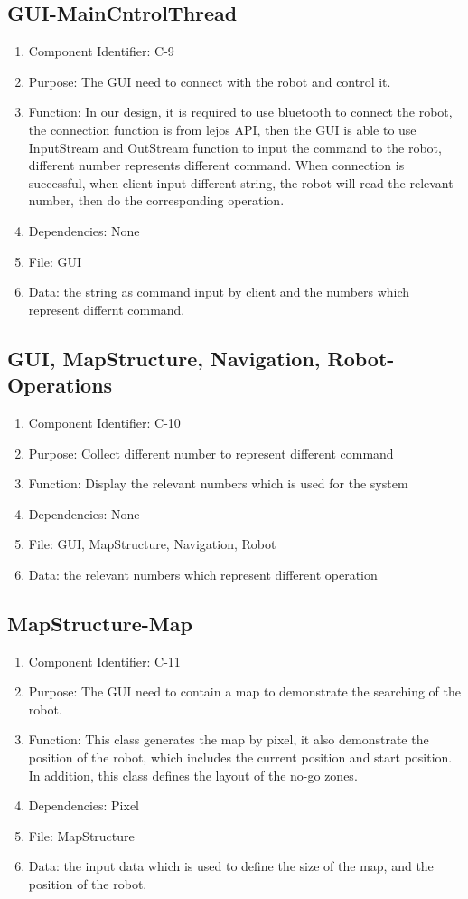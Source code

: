 \documentclass[11pt, a4paper]{report}
\begin{document}
\subsection{GUI-MainCntrolThread}
\begin{enumerate}
\item Component Identifier: C-9
\item Purpose: The GUI need to connect with the robot and control it.
\item Function: In our design, it is required to use bluetooth to connect the robot, the connection function is from lejos API, then the GUI is able to use InputStream and OutStream function to input the command to the robot, different number represents different command. When connection is successful, when client input different string, the robot will read the relevant number, then do the corresponding operation.   
\item Dependencies: None
\item File: GUI
\item Data: the string as command input by client and the numbers which represent differnt command. 
\end{enumerate}

\subsection{GUI, MapStructure, Navigation, Robot-Operations}
\begin{enumerate}
\item Component Identifier: C-10
\item Purpose: Collect different number to represent different command
\item Function: Display the relevant numbers which is used for the system
\item Dependencies: None
\item File: GUI, MapStructure, Navigation, Robot
\item Data: the relevant numbers which represent different operation
\end{enumerate}

\subsection{MapStructure-Map}
\begin{enumerate}
\item Component Identifier: C-11
\item Purpose: The GUI need to contain a map to demonstrate the searching of the robot. 
\item Function: This class generates the map by pixel, it also demonstrate the position of the robot, which includes the current position and start position. In addition, this class defines the layout of the no-go zones.
\item Dependencies: Pixel
\item File: MapStructure
\item Data: the input data which is used to define the size of the map, and the position of the robot.
\end{enumerate}
\end{document}
